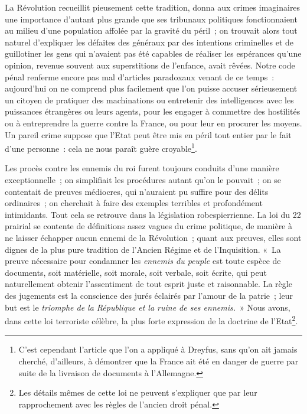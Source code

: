 \documentclass[french,twoside]{book} %
\begin{document}
La Révolution recueillit pieusement cette tradition, donna aux crimes imaginaires une importance d’autant plus grande que ses tribunaux politiques fonctionnaient au milieu d’une population affolée par la gravité du péril ; on trouvait alors tout naturel d’expliquer les défaites des généraux par des intentions criminelles et de guillotiner les gens qui n’avaient pas été capables de réaliser les espérances qu’une opinion, revenue souvent aux superstitions de l’enfance, avait rêvées. Notre code pénal renferme encore pas mal d’articles paradoxaux venant de ce temps : aujourd’hui on ne comprend plus facilement que l’on puisse accuser sérieusement un citoyen de pratiquer des  machinations ou entretenir des intelligences avec les puissances étrangères ou leurs agents, pour les engager à commettre des hostilités ou à entreprendre la guerre contre la France, ou pour leur en procurer les moyens. Un pareil crime suppose que l’Etat peut être mis en péril tout entier par le fait d’une personne : cela ne nous paraît guère croyable\footnote{ \noindent C’est cependant l’article que l’on a appliqué à Dreyfus, sans qu’on ait jamais cherché, d’ailleurs, à démontrer que la France ait été en danger de guerre par suite de la livraison de documents à l’Allemagne.
 }.\par
Les procès contre les ennemis du roi furent toujours conduits d’une manière exceptionnelle ; on simplifiait les procédures autant qu’on le pouvait ; on se contentait de preuves médiocres, qui n’auraient pu suffire pour des délits ordinaires ; on cherchait à faire des exemples terribles et profondément intimidants. Tout cela se retrouve dans la législation robespierrienne. La loi du 22 prairial se contente de définitions assez vagues du crime politique, de manière à ne laisser échapper aucun ennemi de la Révolution ; quant aux preuves, elles sont dignes de la plus pure tradition de l’Ancien Régime et de l’Inquisition. « La preuve nécessaire pour condamner les \emph{ennemis du peuple} est toute espèce de documents, soit matérielle, soit morale, soit verbale, soit écrite, qui peut naturellement obtenir l’assentiment de tout esprit juste et raisonnable. La règle des jugements est la conscience des jurés éclairés par l’amour de la patrie ; leur but est le \emph{triomphe de la République et la ruine de ses ennemis.} » Nous avons, dans  cette loi terroriste célèbre, la plus forte expression de la doctrine de l’Etat\footnote{ \noindent Les détails mêmes de cette loi ne peuvent s’expliquer que par leur rapprochement avec les règles de l’ancien droit pénal.
 }.\par
\end{document}
